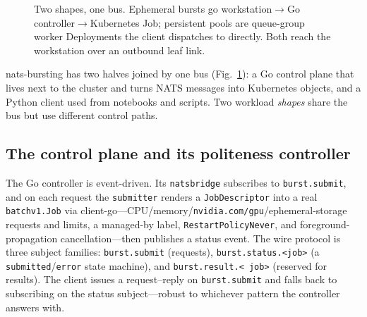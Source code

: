 \documentclass[conference]{IEEEtran}
\begin{document}
\begin{figure}[t]\centering
{}
\caption{Two shapes, one bus. Ephemeral bursts go workstation$\to$Go controller$\to$Kubernetes
Job; persistent pools are queue-group worker Deployments the client dispatches to directly. Both
reach the workstation over an outbound leaf link.}\label{fig:arch}
\end{figure}

nats-bursting has two halves joined by one bus (Fig.~\ref{fig:arch}): a Go control plane that
lives next to the cluster and turns NATS messages into Kubernetes objects, and a Python client
used from notebooks and scripts. Two workload \emph{shapes} share the bus but use different
control paths.

\subsection{The control plane and its politeness controller}
The Go controller is event-driven. Its \texttt{natsbridge} subscribes to \texttt{burst.submit},
and on each request the \texttt{submitter} renders a \texttt{JobDescriptor} into a real
\texttt{batchv1.Job} via client-go---CPU/memory/\texttt{nvidia.com/gpu}/ephemeral-storage requests
and limits, a managed-by label, \texttt{RestartPolicyNever}, and foreground-propagation
cancellation---then publishes a status event. The wire protocol is three subject families:
\texttt{burst.submit} (requests), \texttt{burst.status.\textless job\textgreater} (a
\texttt{submitted}/\texttt{error} state machine), and \texttt{burst.result.\textless
job\textgreater} (reserved for results). The client issues a request--reply on
\texttt{burst.submit} and falls back to subscribing on the status subject---robust to whichever
pattern the controller answers with.
\end{document}
